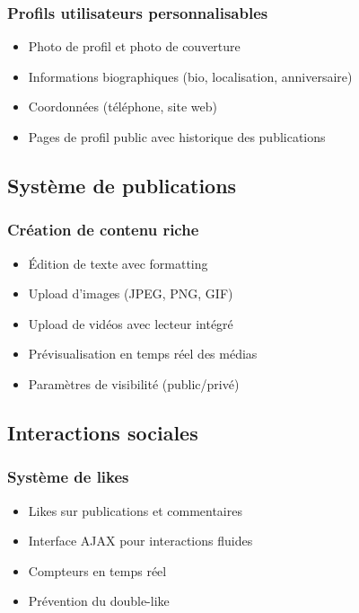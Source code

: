 \documentclass[12pt,a4paper]{article}
\begin{document}
\subsubsection{Profils utilisateurs personnalisables}
\begin{itemize}
    \item Photo de profil et photo de couverture
    \item Informations biographiques (bio, localisation, anniversaire)
    \item Coordonn\'ees (t\'el\'ephone, site web)
    \item Pages de profil public avec historique des publications
\end{itemize}

\subsection{Syst\`eme de publications}

\subsubsection{Cr\'eation de contenu riche}
\begin{itemize}
    \item \'Edition de texte avec formatting
    \item Upload d'images (JPEG, PNG, GIF)
    \item Upload de vid\'eos avec lecteur int\'egr\'e
    \item Pr\'evisualisation en temps r\'eel des m\'edias
    \item Param\`etres de visibilit\'e (public/priv\'e)
\end{itemize}

\subsection{Interactions sociales}

\subsubsection{Syst\`eme de likes}
\begin{itemize}
    \item Likes sur publications et commentaires
    \item Interface AJAX pour interactions fluides
    \item Compteurs en temps r\'eel
    \item Pr\'evention du double-like
\end{itemize}
\end{document}
